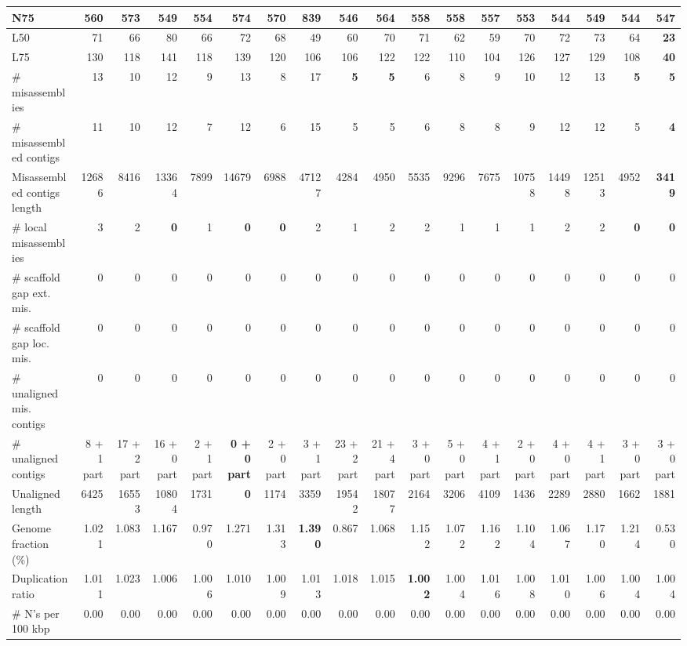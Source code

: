 \documentclass[12pt,a4paper]{article}
\begin{document}
\begin{table}[ht]
\begin{center}
\begin{tabular}{|l*{17}{|r}|}
N75 & 560 & 573 & 549 & 554 & 574 & 570 & {\bf 839} & 546 & 564 & 558 & 558 & 557 & 553 & 544 & 549 & 544 & 547 \\ \hline
L50 & 71 & 66 & 80 & 66 & 72 & 68 & 49 & 60 & 70 & 71 & 62 & 59 & 70 & 72 & 73 & 64 & {\bf 23} \\ \hline
L75 & 130 & 118 & 141 & 118 & 139 & 120 & 106 & 106 & 122 & 122 & 110 & 104 & 126 & 127 & 129 & 108 & {\bf 40} \\ \hline
\# misassemblies & 13 & 10 & 12 & 9 & 13 & 8 & 17 & {\bf 5} & {\bf 5} & 6 & 8 & 9 & 10 & 12 & 13 & {\bf 5} & {\bf 5} \\ \hline
\# misassembled contigs & 11 & 10 & 12 & 7 & 12 & 6 & 15 & 5 & 5 & 6 & 8 & 8 & 9 & 12 & 12 & 5 & {\bf 4} \\ \hline
Misassembled contigs length & 12686 & 8416 & 13364 & 7899 & 14679 & 6988 & 47127 & 4284 & 4950 & 5535 & 9296 & 7675 & 10758 & 14498 & 12513 & 4952 & {\bf 3419} \\ \hline
\# local misassemblies & 3 & 2 & {\bf 0} & 1 & {\bf 0} & {\bf 0} & 2 & 1 & 2 & 2 & 1 & 1 & 1 & 2 & 2 & {\bf 0} & {\bf 0} \\ \hline
\# scaffold gap ext. mis. & 0 & 0 & 0 & 0 & 0 & 0 & 0 & 0 & 0 & 0 & 0 & 0 & 0 & 0 & 0 & 0 & 0 \\ \hline
\# scaffold gap loc. mis. & 0 & 0 & 0 & 0 & 0 & 0 & 0 & 0 & 0 & 0 & 0 & 0 & 0 & 0 & 0 & 0 & 0 \\ \hline
\# unaligned mis. contigs & 0 & 0 & 0 & 0 & 0 & 0 & 0 & 0 & 0 & 0 & 0 & 0 & 0 & 0 & 0 & 0 & 0 \\ \hline
\# unaligned contigs & 8 + 1 part & 17 + 2 part & 16 + 0 part & 2 + 1 part & {\bf 0 + 0 part} & 2 + 0 part & 3 + 1 part & 23 + 2 part & 21 + 4 part & 3 + 0 part & 5 + 0 part & 4 + 1 part & 2 + 0 part & 4 + 0 part & 4 + 1 part & 3 + 0 part & 3 + 0 part \\ \hline
Unaligned length & 6425 & 16553 & 10804 & 1731 & {\bf 0} & 1174 & 3359 & 19542 & 18077 & 2164 & 3206 & 4109 & 1436 & 2289 & 2880 & 1662 & 1881 \\ \hline
Genome fraction (\%) & 1.021 & 1.083 & 1.167 & 0.970 & 1.271 & 1.313 & {\bf 1.390} & 0.867 & 1.068 & 1.152 & 1.072 & 1.162 & 1.104 & 1.067 & 1.170 & 1.214 & 0.530 \\ \hline
Duplication ratio & 1.011 & 1.023 & 1.006 & 1.006 & 1.010 & 1.009 & 1.013 & 1.018 & 1.015 & {\bf 1.002} & 1.004 & 1.016 & 1.008 & 1.010 & 1.006 & 1.004 & 1.004 \\ \hline
\# N's per 100 kbp & 0.00 & 0.00 & 0.00 & 0.00 & 0.00 & 0.00 & 0.00 & 0.00 & 0.00 & 0.00 & 0.00 & 0.00 & 0.00 & 0.00 & 0.00 & 0.00 & 0.00 \\ \hline

\end{tabular}
\end{center}
\end{table}
\end{document}
